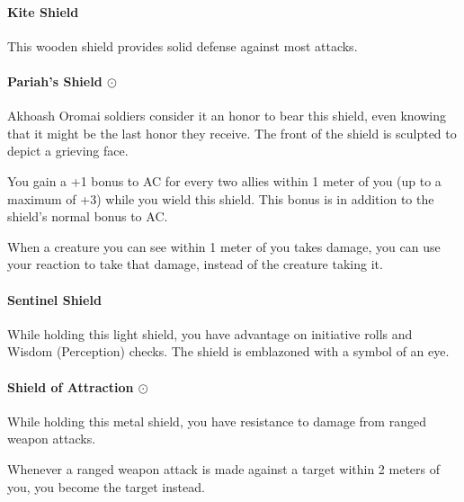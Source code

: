     \paragraph{Kite Shield}
        This wooden shield provides solid defense against most attacks.
    \paragraph{Pariah's Shield $\odot$}
        Akhoash Oromai soldiers consider it an honor to bear this shield, even knowing that it might be the last honor they receive.
        The front of the shield is sculpted to depict a grieving face.

        You gain a +1 bonus to AC for every two allies within 1 meter of you (up to a maximum of +3) while you wield this shield.
        This bonus is in addition to the shield's normal bonus to AC.

        When a creature you can see within 1 meter of you takes damage, you can use your reaction to take that damage, instead of the creature taking it.
    \paragraph{Sentinel Shield}
        While holding this light shield, you have advantage on initiative rolls and Wisdom (Perception) checks.
        The shield is emblazoned with a symbol of an eye.
    \paragraph{Shield of Attraction $\odot$}
        While holding this metal shield, you have resistance to damage from ranged weapon attacks.

        Whenever a ranged weapon attack is made against a target within 2 meters of you, you become the target instead.
